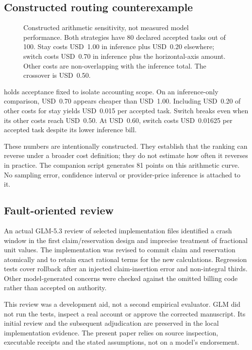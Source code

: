 \documentclass[10pt,twocolumn]{article}
\begin{document}
\subsection{Constructed routing counterexample}

\begin{figure}[t]
\centering

\caption{Constructed arithmetic sensitivity, not measured model performance. Both strategies have 80 declared accepted tasks out of 100. Stay costs USD~1.00 in inference plus USD~0.20 elsewhere; switch costs USD~0.70 in inference plus the horizontal-axis amount. Other costs are non-overlapping with the inference total. The crossover is USD~0.50.}
\label{fig:sensitivity}
\end{figure}

 holds acceptance fixed to isolate accounting scope. On an inference-only comparison, USD~0.70 appears cheaper than USD~1.00. Including USD~0.20 of other costs for stay yields USD~0.015 per accepted task. Switch breaks even when its other costs reach USD~0.50. At USD~0.60, switch costs USD~0.01625 per accepted task despite its lower inference bill.

These numbers are intentionally constructed. They establish that the ranking can reverse under a broader cost definition; they do not estimate how often it reverses in practice. The companion script generates 81 points on this arithmetic curve. No sampling error, confidence interval or provider-price inference is attached to it.

\subsection{Fault-oriented review}

An actual GLM-5.3 review of selected implementation files identified a crash window in the first claim/reservation design and imprecise treatment of fractional unit values. The implementation was revised to commit claim and reservation atomically and to retain exact rational terms for the new calculations. Regression tests cover rollback after an injected claim-insertion error and non-integral thirds. Other model-generated concerns were checked against the omitted billing code rather than accepted on authority.

This review was a development aid, not a second empirical evaluator. GLM did not run the tests, inspect a real account or approve the corrected manuscript. Its initial review and the subsequent adjudication are preserved in the local implementation evidence. The present paper relies on source inspection, executable receipts and the stated assumptions, not on a model's endorsement.
\end{document}
